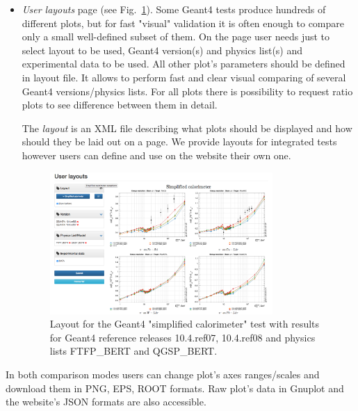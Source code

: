 \begin{itemize}
\item \textit{User layouts} page (see Fig.~\ref{fig:layouts}). Some Geant4 tests produce hundreds of different plots, but for fast "visual" validation it is often enough to compare only a small well-defined subset of them. On the page user needs just to select layout to be used, Geant4 version(s) and physics list(s) and experimental data to be used. All other plot's parameters should be defined in layout file. It allows to perform fast and clear visual comparing of several Geant4 versions/physics lists. For all plots there is possibility to request ratio plots to see difference between them in detail.

The \textit{layout} is an XML file describing what plots should be displayed and how should they be laid out on a page. We provide layouts for integrated tests however users can define and use on the website their own one.

\begin{figure}[h]
    \centering
    \includegraphics[width=0.8\textwidth,clip]{layout_sc.png}
    \caption{Layout for the Geant4 "simplified calorimeter" test with results for Geant4 reference releases 10.4.ref07, 10.4.ref08 and physics lists FTFP\_BERT and QGSP\_BERT.}
    \label{fig:layouts}
\end{figure}

\end{itemize}

In both comparison modes users can change plot's axes ranges/scales and download them in PNG, EPS, ROOT formats. Raw plot's data in Gnuplot and the website's JSON formats are also accessible.